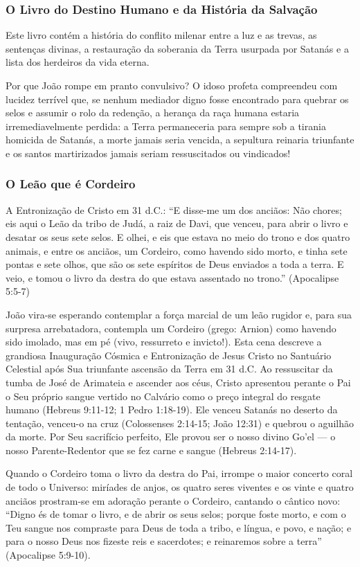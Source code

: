 \documentclass[11pt,a4paper,openany]{book}
\begin{document}
\subsubsection*{O Livro do Destino Humano e da História da Salvação}
Este livro contém a história do conflito milenar entre a luz e as trevas, as sentenças divinas, a restauração da soberania da Terra usurpada por Satanás e a lista dos herdeiros da vida eterna.

Por que João rompe em pranto convulsivo? O idoso profeta compreendeu com lucidez terrível que, se nenhum mediador digno fosse encontrado para quebrar os selos e assumir o rolo da redenção, a herança da raça humana estaria irremediavelmente perdida: a Terra permaneceria para sempre sob a tirania homicida de Satanás, a morte jamais seria vencida, a sepultura reinaria triunfante e os santos martirizados jamais seriam ressuscitados ou vindicados!


\subsubsection*{O Leão que é Cordeiro}
A Entronização de Cristo em 31 d.C.:
``E disse-me um dos anciãos: Não chores; eis aqui o Leão da tribo de Judá, a raiz de Davi, que venceu, para abrir o livro e desatar os seus sete selos. E olhei, e eis que estava no meio do trono e dos quatro animais, e entre os anciãos, um Cordeiro, como havendo sido morto, e tinha sete pontas e sete olhos, que são os sete espíritos de Deus enviados a toda a terra. E veio, e tomou o livro da destra do que estava assentado no trono.'' (Apocalipse 5:5-7)

João vira-se esperando contemplar a força marcial de um leão rugidor e, para sua surpresa arrebatadora, contempla um Cordeiro (grego: Arnion) como havendo sido imolado, mas em pé (vivo, ressurreto e invicto!).
Esta cena descreve a grandiosa Inauguração Cósmica e Entronização de Jesus Cristo no Santuário Celestial após Sua triunfante ascensão da Terra em 31 d.C. Ao ressuscitar da tumba de José de Arimateia e ascender aos céus, Cristo apresentou perante o Pai o Seu próprio sangue vertido no Calvário como o preço integral do resgate humano (Hebreus 9:11-12; 1 Pedro 1:18-19). Ele venceu Satanás no deserto da tentação, venceu-o na cruz (Colossenses 2:14-15; João 12:31) e quebrou o aguilhão da morte. Por Seu sacrifício perfeito, Ele provou ser o nosso divino Go'el — o nosso Parente-Redentor que se fez carne e sangue (Hebreus 2:14-17).

Quando o Cordeiro toma o livro da destra do Pai, irrompe o maior concerto coral de todo o Universo: miríades de anjos, os quatro seres viventes e os vinte e quatro anciãos prostram-se em adoração perante o Cordeiro, cantando o cântico novo: ``Digno és de tomar o livro, e de abrir os seus selos; porque foste morto, e com o Teu sangue nos compraste para Deus de toda a tribo, e língua, e povo, e nação; e para o nosso Deus nos fizeste reis e sacerdotes; e reinaremos sobre a terra'' (Apocalipse 5:9-10).
\end{document}
